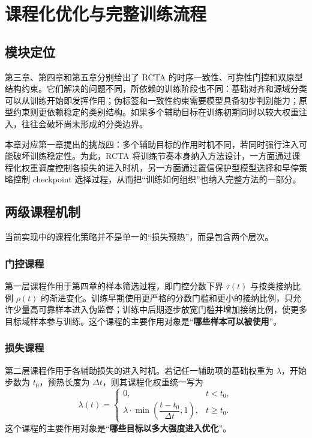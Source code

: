\chapter{课程化优化与完整训练流程}

\section{模块定位}
第三章、第四章和第五章分别给出了 RCTA 的时序一致性、可靠性门控和双原型结构约束。它们解决的问题不同，所依赖的训练阶段也不同：基础对齐和源域分类可以从训练开始即发挥作用；伪标签和一致性约束需要模型具备初步判别能力；原型约束则更依赖稳定的类别结构。如果多个辅助目标在训练初期同时以较大权重注入，往往会破坏尚未形成的分类边界。

本章对应第一章提出的挑战四：多个辅助目标的作用时机不同，若同时强行注入可能破坏训练稳定性。为此，RCTA 将训练节奏本身纳入方法设计，一方面通过课程化权重调度控制各损失的进入时机，另一方面通过置信保护型模型选择和早停策略控制 checkpoint 选择过程，从而把“训练如何组织”也纳入完整方法的一部分。

\section{两级课程机制}
当前实现中的课程化策略并不是单一的“损失预热”，而是包含两个层次。

\subsection{门控课程}
第一层课程作用于第四章的样本筛选过程，即门控分数下界 $\tau(t)$ 与按类接纳比例 $\rho(t)$ 的渐进变化。训练早期使用更严格的分数门槛和更小的接纳比例，只允许少量高可靠样本进入伪监督；训练中后期逐步放宽门槛并增加接纳比例，使更多目标域样本参与训练。这个课程的主要作用对象是“\textbf{哪些样本可以被使用}”。

\subsection{损失课程}
第二层课程作用于各辅助损失的进入时机。若记任一辅助项的基础权重为 $\lambda$，开始步数为 $t_0$，预热长度为 $\Delta t$，则其课程化权重统一写为
\begin{equation}
\lambda(t)=
\begin{cases}
0, & t<t_0,\\
\lambda \cdot \min\left(\dfrac{t-t_0}{\Delta t},1\right), & t\ge t_0.
\end{cases}
\end{equation}
这个课程的主要作用对象是“\textbf{哪些目标以多大强度进入优化}”。

